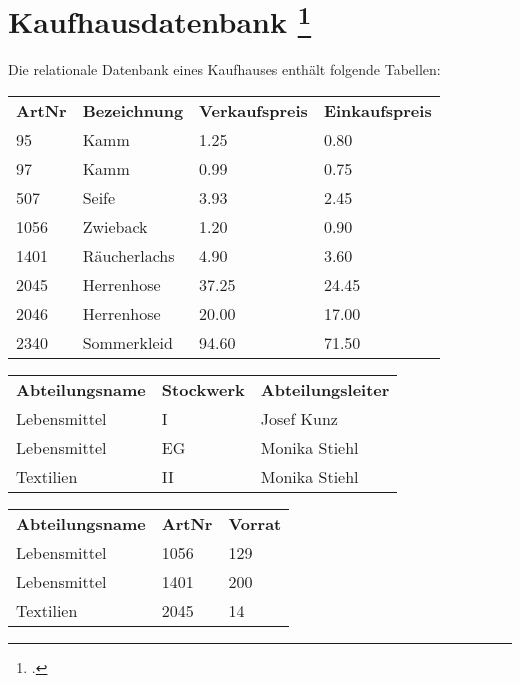 \documentclass{bschlangaul-aufgabe}
\begin{document}

\section{Kaufhausdatenbank
\footcite[Aufgabe 1: Kaufhausdatenbank - einfacher Einstieg]{db:ab:2}
}

Die relationale Datenbank eines Kaufhauses enthält folgende Tabellen:


\begin{tabular}{llll}
\textbf{ArtNr} & \textbf{Bezeichnung}  & \textbf{Verkaufspreis} & \textbf{Einkaufspreis} \\
95    & Kamm         & 1.25          & 0.80          \\
97    & Kamm         & 0.99          & 0.75          \\
507   & Seife        & 3.93          & 2.45          \\
1056  & Zwieback     & 1.20          & 0.90          \\
1401  & Räucherlachs & 4.90          & 3.60          \\
2045  & Herrenhose   & 37.25         & 24.45         \\
2046  & Herrenhose   & 20.00         & 17.00         \\
2340  & Sommerkleid  & 94.60         & 71.50
\end{tabular}


\begin{tabular}{lll}
\textbf{Abteilungsname} & \textbf{Stockwerk} & \textbf{Abteilungsleiter} \\
Lebensmittel   & I         & Josef Kunz       \\
Lebensmittel   & EG        & Monika Stiehl    \\
Textilien      & II        & Monika Stiehl
\end{tabular}


\begin{tabular}{lll}
\textbf{Abteilungsname}  & \textbf{ArtNr} & \textbf{Vorrat} \\
Lebensmittel    & 1056  & 129    \\
Lebensmittel    & 1401  & 200    \\
Textilien       & 2045  & 14
\end{tabular}
\end{document}

